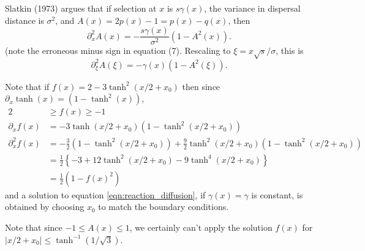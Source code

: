 \documentclass{article}
\begin{document}
Slatkin (1973) argues that if selection at $x$ is $s\gamma(x)$,
the variance in dispersal distance is $\sigma^2$,
and $A(x) = 2p(x)-1 = p(x)-q(x)$, then
\begin{equation}
    \partial_x^2 A(x) = - \frac{s \gamma(x)}{\sigma^2} \left( 1- A^2(x) \right).
\end{equation}
(note the erroneous minus sign in equation (7).
Rescaling to $\xi = x \sqrt{s}/\sigma$, this is
\begin{equation} \label{eqn:reaction_diffusion}
    \partial_\xi^2 A(\xi) = - \gamma(x) \left( 1- A^2(\xi) \right).
\end{equation}

Note that if $f(x) = 2 - 3 \tanh^2(x/2+x_0)$ then since $\partial_x \tanh(x) = (1-\tanh^2(x))$,
\begin{align*}
    2 &\ge f(x) \ge -1 \\
    \partial_x f(x) &= - 3 \tanh(x/2+x_0) \left( 1- \tanh^2(x/2+x_0) \right) \\
    \partial^2_x f(x) &= - \frac{3}{2} \left( 1- \tanh^2(x/2+x_0) \right) 
    + \frac{9}{2} \tanh^2(x/2+x_0) \left(1-\tanh^2(x/2+x_0)\right) \\
        &= \frac{1}{2} \left\{ - 3 + 12 \tanh^2(x/2+x_0) - 9 \tanh^4(x/2+x_0) \right\} \\
        &= \frac{1}{2} \left(1-f(x)^2 \right)
\end{align*}
and a solution to equation \eqref{eqn:reaction_diffusion}, if $\gamma(x)=\gamma$ is constant,
is obtained by choosing $x_0$ to match the boundary conditions.

Note that since $-1\le A(x) \le 1$, we certainly can't apply the solution $f(x)$
for $|x/2+x_0| \le \tanh^{-1}(1/\sqrt{3})$.
\end{document}
